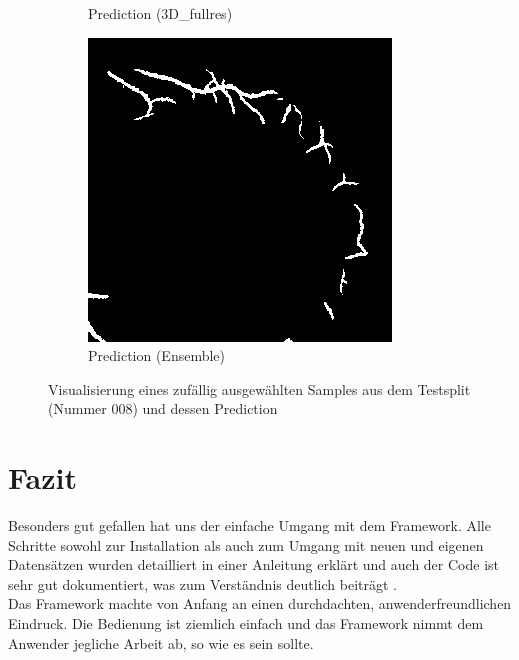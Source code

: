 \begin{figure}[H]
\begin{minipage}{.3\textwidth}
\begin{subfigure}{\textwidth}
\caption{Prediction (3D\_fullres)}
\end{subfigure}
\end{minipage}
\begin{minipage}{.3\textwidth}
\begin{subfigure}{\textwidth}
\includegraphics[width=\textwidth]{Pictures/nnUnet/Praxis/Task108-Retina3D/vis/ens_008-66.png}
\caption{Prediction (Ensemble)}
\end{subfigure}
\end{minipage}
\caption{Visualisierung eines zufällig ausgewählten Samples aus dem Testsplit (Nummer 008) und dessen Prediction}
\label{pic:Vis_108}
\end{figure}






\section{Fazit}
Besonders gut gefallen hat uns der einfache Umgang mit dem Framework. Alle Schritte sowohl zur Installation als auch zum Umgang mit neuen und eigenen Datensätzen wurden detailliert in einer Anleitung erklärt und auch der Code ist sehr gut dokumentiert, was zum Verständnis deutlich beiträgt \cite{nnunetGithub}.\\
Das Framework machte von Anfang an einen durchdachten, anwenderfreundlichen Eindruck. Die Bedienung ist ziemlich einfach und das Framework nimmt dem Anwender jegliche Arbeit ab, so wie es sein sollte.
